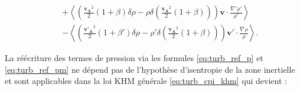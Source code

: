 \begin{equation}
{\begin{array}{lcl}
&&+  \left< \left(\frac{\boldsymbol{v_A}^2}{2} \left(1+\beta\right) \delta \rho - \rho \delta \left(\frac{\boldsymbol{v_A}^2}{2} \left(1+\beta\right)\right)  \right)\boldsymbol{v} \cdot \frac{\nabla' \rho'}{\rho'}\right>\\
&&- \left<\left(\frac{\boldsymbol{v'_A}^2}{2} \left(1+\beta'\right) \delta \rho - \rho' \delta \left(\frac{\boldsymbol{v_A}^2}{2} \left(1+\beta\right)\right)  \right)  \boldsymbol{v'} \cdot \frac{\nabla \rho}{\rho} \right> .
\end{array}}
\end{equation} 

La réécriture des termes de pression via les formules \eqref{eq:turb_ref_p} et \eqref{eq:turb_ref_pm} ne dépend pas de l'hypothèse d'isentropie de la zone inertielle et sont applicables dans la loi \acs{KHM} générale \eqref{eq:turb_cpi_khm} qui devient :
